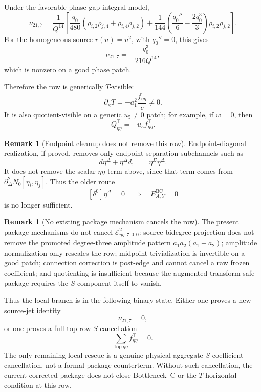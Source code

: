 \documentclass[11pt,a4paper]{amsart}
\theoremstyle{plain}
\theoremstyle{definition}
\newtheorem{remark}[theorem]{Remark}
\begin{document}
Under the favorable phase-gap integral model,
\[
\nu_{21,7}
=
\frac{1}{Q^{14}}
\left[
\frac{q_0}{480}
(\rho_{i,2}\rho_{j,4}+\rho_{i,4}\rho_{j,2})
+
\frac{1}{144}
\left(
\frac{q_0''}{6}
-
\frac{2q_0^3}{3}
\right)
\rho_{i,2}\rho_{j,2}
\right].
\]
For the homogeneous source \(r(u)=u^2\), with \(q_0''=0\), this gives
\[
\nu_{21,7}
=
-\frac{q_0^3}{216Q^{14}},
\]
which is nonzero on a good phase patch.

Therefore the row is generically \(T\)-visible:
\[
\partial_\kappa T
=
-a_1^2\frac{f_{\eta\eta}^{\top}}{c}
\ne0.
\]
It is also quotient-visible on a generic \(u_5\ne0\) patch; for example, if
\(w=0\), then
\[
Q_{\eta\eta}^{\top}
=
-u_5 f_{\eta\eta}^{\top}.
\]

\begin{remark}[Endpoint cleanup does not remove this row]
\label{rem:endpoint-cleanup-does-not-remove-row}
Endpoint-diagonal realization, if proved, removes only endpoint-separation
subchannels such as
\[
d\eta^\Delta+\eta^\Delta d,
\qquad
\eta^\Sigma\eta^\Delta.
\]
It does not remove the scalar \(\eta\eta\) term above, since that term comes
from \(\partial_\Delta^2N_0[\eta_i,\eta_j]\).  Thus the older route
\[
[\delta^0]\eta^\Delta=0
\quad\Longrightarrow\quad
E_{A,Y}^{\mathrm{BC}}=0
\]
is no longer sufficient.
\end{remark}

\begin{remark}[No existing package mechanism cancels the row]
\label{rem:no-existing-package-mechanism-cancels-row}
The present package mechanisms do not cancel
\(\mathcal E^{2}_{\eta\eta;7,0,0}\):
source-bidegree projection does not remove the promoted degree-three amplitude
pattern \(a_1a_2(a_1+a_2)\); amplitude normalization only rescales the row;
midpoint trivialization is invertible on a good patch; connection correction is
post-edge and cannot cancel a raw frozen coefficient; and quotienting is
insufficient because the augmented transform-safe package requires the
\(S\)-component itself to vanish.
\end{remark}

Thus the local branch is in the following binary state.  Either one proves a
new source-jet identity
\[
\nu_{21,7}=0,
\]
or one proves a full top-row \(S\)-cancellation
\[
\sum_{\mathrm{top}\ \eta\eta} f_{\eta\eta}^{\top}=0.
\]
The only remaining local rescue is a genuine physical aggregate
\(S\)-coefficient cancellation, not a formal package counterterm.  Without
such cancellation, the current corrected package does not close
Bottleneck~C or the \(T\)-horizontal condition at this row.
\end{document}
